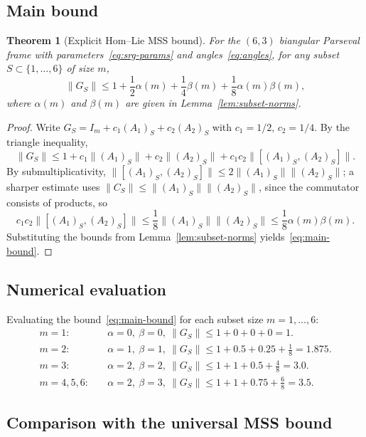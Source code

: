 \documentclass[a4paper]{amsart}
\theoremstyle{plain}
\newtheorem{theorem}{Theorem}[section]
\theoremstyle{definition}
\theoremstyle{remark}
\begin{document}
	\subsection{Main bound}
	\label{subsec:main-bound}
	
	\begin{theorem}[Explicit Hom--Lie MSS bound]\label{thm:main-bound}
		For the $(6,3)$ biangular Parseval frame with parameters~\eqref{eq:srg-params} and angles~\eqref{eq:angles}, for any subset $S \subset \{1,\dots,6\}$ of size $m$,
		\begin{equation}
			\|G_S\| \le 1 + \frac{1}{2}\alpha(m) + \frac{1}{4}\beta(m) + \frac{1}{8}\alpha(m)\beta(m), \label{eq:main-bound}
		\end{equation}
		where $\alpha(m)$ and $\beta(m)$ are given in Lemma~\ref{lem:subset-norms}.
	\end{theorem}
	\begin{proof} Write $G_S = I_m + c_1(A_1)_S + c_2(A_2)_S$ with $c_1=1/2$, $c_2=1/4$. By the triangle inequality,
		\[
		\|G_S\| \le 1 + c_1\|(A_1)_S\| + c_2\|(A_2)_S\| + c_1c_2\|[(A_1)_S, (A_2)_S]\|.
		\]
		By submultiplicativity, $\|[(A_1)_S, (A_2)_S]\| \le 2\|(A_1)_S\|\|(A_2)_S\|$; a sharper estimate uses $\|C_S\| \le \|(A_1)_S\|\|(A_2)_S\|$, since the commutator consists of products, so
		\[
		c_1c_2\|[(A_1)_S, (A_2)_S]\| \le \frac{1}{8}\|(A_1)_S\|\|(A_2)_S\| \le \frac{1}{8}\alpha(m)\beta(m).
		\]
		Substituting the bounds from Lemma~\ref{lem:subset-norms} yields~\eqref{eq:main-bound}.
	\end{proof}
	
	\subsection{Numerical evaluation}
	\label{subsec:numerical}
	
	Evaluating the bound~\eqref{eq:main-bound} for each subset size $m = 1,\dots,6$:
	\begin{align*}
		m=1:&\quad \alpha=0,\ \beta=0,\ \|G_S\| \le 1 + 0 + 0 + 0 = 1.\\[4pt]
		m=2:&\quad \alpha=1,\ \beta=1,\ \|G_S\| \le 1 + 0.5 + 0.25 + \tfrac{1}{8} = 1.875.\\[4pt]
		m=3:&\quad \alpha=2,\ \beta=2,\ \|G_S\| \le 1 + 1 + 0.5 + \tfrac{4}{8} = 3.0.\\[4pt]
		m=4,5,6:&\quad \alpha=2,\ \beta=3,\ \|G_S\| \le 1 + 1 + 0.75 + \tfrac{6}{8} = 3.5.
	\end{align*}
	
	\subsection{Comparison with the universal MSS bound}
	\label{subsec:comparison}
	
\end{document}
